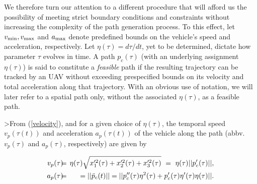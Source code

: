 \documentclass[]{aiaa-tc}%
\begin{document}
We therefore turn our attention to a different procedure that will
afford us the possibility of meeting strict boundary conditions
and constraints without increasing the complexity of the path
generation process. To this effect, let $v_{{\rm min}}, v_{{\rm
max}}$ and $a_{{\rm max}}$ denote predefined bounds on the
vehicle's speed and acceleration, respectively. Let $\eta(\tau) =
d\tau/dt$, yet to be determined, dictate how parameter $\tau$
evolves in time. A path $p_c(\tau)$ (with an underlying assignment
$\eta(\tau)$) is said to constitute a \textit{feasible} path if
the resulting trajectory can be tracked by an UAV without
exceeding prespecified bounds on its velocity and total
acceleration along that trajectory. With an obvious use of
notation, we will later refer to a spatial path only, without the
associated $\eta(\tau)$, as a feasible path.

>From (\ref{velocity}), and for a given choice of $\eta(\tau)$, the
temporal speed $v_p(\tau(t))$ and acceleration $a_p(\tau(t))$ of
the vehicle along the path (abbv. $v_p(\tau)$ and $a_p(\tau)$,
respectively) are given by

\begin{eqnarray} \nonumber
v_p(\tau) \hspace{ -0.2 cm} &=& \hspace{ -0.2 cm} \eta(\tau)
\sqrt{x'^2_{1}(\tau) + x'^2_{2}(\tau) + x'^2_{3}(\tau)} ~ = ~
\eta(\tau) ||p'_c(\tau)||, \\
\label{velacc} a_p(\tau) \hspace{ -0.2 cm} &=& \hspace{ -0.2 cm}
=||\ddot{p}_c(t) || = ||p''_c(\tau) \eta^2(\tau) + p'_c(\tau) \eta'(\tau)  \eta(\tau)||.
\end{eqnarray}
\end{document}
